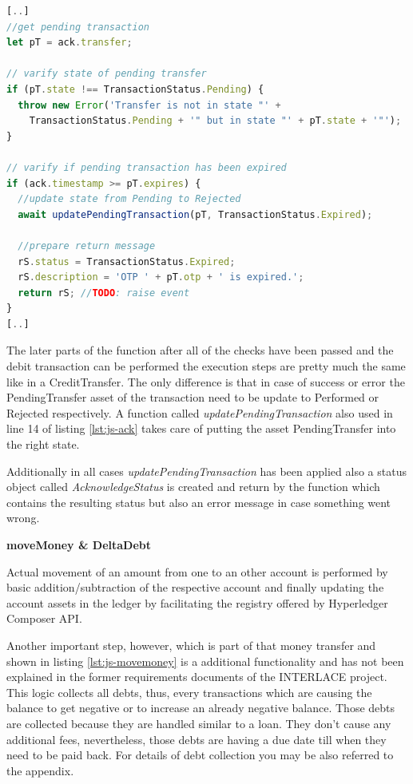 \begin{center}
\begin{minipage}{0.8\textwidth}
\small
\begin{lstlisting}[language=javascript,firstnumber=1,caption={\bf\small RequestDebitAcknowledge JavaScript excerpt}, captionpos=b,label=lst:js-ack]
[..]
//get pending transaction
let pT = ack.transfer;

// varify state of pending transfer
if (pT.state !== TransactionStatus.Pending) {
  throw new Error('Transfer is not in state "' +
    TransactionStatus.Pending + '" but in state "' + pT.state + '"');
}

// varify if pending transaction has been expired
if (ack.timestamp >= pT.expires) {
  //update state from Pending to Rejected
  await updatePendingTransaction(pT, TransactionStatus.Expired);

  //prepare return message
  rS.status = TransactionStatus.Expired;
  rS.description = 'OTP ' + pT.otp + ' is expired.';
  return rS; //TODO: raise event
}
[..]
\end{lstlisting}
\end{minipage}
\end{center}

The later parts of the function after all of the checks have been passed and the debit transaction can be performed the execution steps are pretty much the same like in a CreditTransfer. The only difference is that in case of success or error the PendingTransfer asset of the transaction need to be update to Performed or Rejected respectively. A function called \textit{updatePendingTransaction} also used in line 14 of listing \ref{lst:js-ack} takes care of putting the asset PendingTransfer into the right state.

Additionally in all cases \textit{updatePendingTransaction} has been applied also a status object called \textit{AcknowledgeStatus} is created and return by the function which contains the resulting status but also an error message in case something went wrong.

\textbf{moveMoney \& DeltaDebt}

Actual movement of an amount from one to an other account is performed by basic addition/subtraction of the respective account and finally updating the account assets in the ledger by facilitating the registry offered by Hyperledger Composer API.

Another important step, however, which is part of that money transfer and shown in listing \ref{lst:js-movemoney} is a additional functionality and has not been explained in the former requirements documents of the INTERLACE project. This logic collects all debts, thus, every transactions which are causing the balance to get negative or to increase an already negative balance. Those debts are collected because they are handled similar to a loan. They don't cause any additional fees, nevertheless, those debts are having a due date till when they need to be paid back. For details of debt collection you may be also referred to the appendix.

